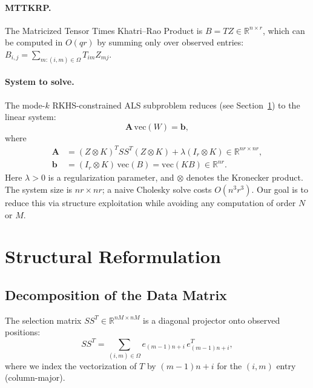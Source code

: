 \documentclass[12pt]{article}
\theoremstyle{definition}
\begin{document}
\paragraph{MTTKRP.}
The Matricized Tensor Times Khatri--Rao Product is $B = TZ \in \mathbb{R}^{n \times r}$, which can be computed in $O(qr)$ by summing only over observed entries: $B_{i,j} = \sum_{m:(i,m)\in\Omega} T_{im} Z_{mj}$.

\paragraph{System to solve.}
The mode-$k$ RKHS-constrained ALS subproblem reduces (see Section~\ref{sec:derivation}) to the linear system:
\begin{equation}\label{eq:main-system}
\mathbf{A}\,\mathrm{vec}(W) = \mathbf{b},
\end{equation}
where
\begin{align}
\mathbf{A} &= (Z \otimes K)^T S S^T (Z \otimes K) + \lambda (I_r \otimes K) \in \mathbb{R}^{nr \times nr}, \label{eq:A-def}\\
\mathbf{b} &= (I_r \otimes K)\,\mathrm{vec}(B) = \mathrm{vec}(KB) \in \mathbb{R}^{nr}. \label{eq:b-def}
\end{align}
Here $\lambda > 0$ is a regularization parameter, and $\otimes$ denotes the Kronecker product. The system size is $nr \times nr$; a naive Cholesky solve costs $O(n^3 r^3)$. Our goal is to reduce this via structure exploitation while avoiding any computation of order $N$ or $M$.

\section{Structural Reformulation}\label{sec:derivation}

\subsection{Decomposition of the Data Matrix}

The selection matrix $SS^T \in \mathbb{R}^{nM \times nM}$ is a diagonal projector onto observed positions:
\[
SS^T = \sum_{(i,m)\in\Omega} e_{(m-1)n+i}\,e_{(m-1)n+i}^T,
\]
where we index the vectorization of $T$ by $(m-1)n + i$ for the $(i,m)$ entry (column-major).
\end{document}

